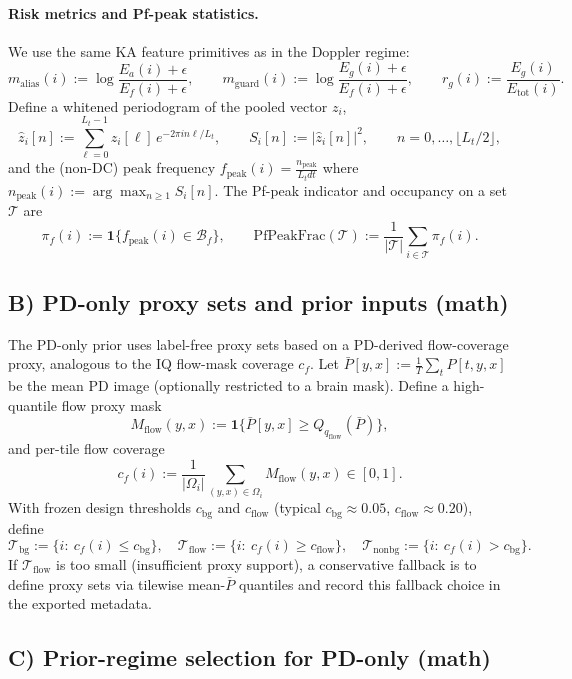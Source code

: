 \documentclass[11pt]{article}
\newcommand{\wh}{\widehat}
\newcommand{\Cf}{\mathcal{B}_f}
\begin{document}
\paragraph{Risk metrics and Pf-peak statistics.}
We use the same KA feature primitives as in the Doppler regime:
\[
m_{\mathrm{alias}}(i) := \log\frac{E_a(i)+\epsilon}{E_f(i)+\epsilon},\qquad
m_{\mathrm{guard}}(i) := \log\frac{E_g(i)+\epsilon}{E_f(i)+\epsilon},\qquad
r_g(i) := \frac{E_g(i)}{E_{\mathrm{tot}}(i)}.
\]
Define a whitened periodogram of the pooled vector $z_i$,
\[
\wh z_i[n] := \sum_{\ell=0}^{L_t-1} z_i[\ell]\,e^{-2\pi i n\ell/L_t},\qquad
S_i[n] := |\wh z_i[n]|^2,\qquad n=0,\dots,\lfloor L_t/2\rfloor,
\]
and the (non-DC) peak frequency $f_{\mathrm{peak}}(i)=\frac{n_{\mathrm{peak}}}{L_t dt}$ where
$n_{\mathrm{peak}}(i):=\arg\max_{n\ge 1} S_i[n]$. The Pf-peak indicator and occupancy on a set $\mathcal{T}$ are
\[
\pi_f(i) := \mathbf{1}\{f_{\mathrm{peak}}(i)\in\Cf\},\qquad
\mathrm{PfPeakFrac}(\mathcal{T}) := \frac{1}{|\mathcal{T}|}\sum_{i\in\mathcal{T}}\pi_f(i).
\]

\subsection*{B) PD-only proxy sets and prior inputs (math)}
The PD-only prior uses label-free proxy sets based on a PD-derived flow-coverage proxy, analogous to the IQ flow-mask coverage $c_f$.
Let $\bar P[y,x] := \frac{1}{T}\sum_t P[t,y,x]$ be the mean PD image (optionally restricted to a brain mask). Define a high-quantile flow proxy mask
\[
M_{\mathrm{flow}}(y,x) := \mathbf{1}\{\bar P[y,x]\ge Q_{q_{\mathrm{flow}}}(\bar P)\},
\]
and per-tile flow coverage
\[
c_f(i) := \frac{1}{|\Omega_i|}\sum_{(y,x)\in\Omega_i} M_{\mathrm{flow}}(y,x)\in[0,1].
\]
With frozen design thresholds $c_{\mathrm{bg}}$ and $c_{\mathrm{flow}}$ (typical $c_{\mathrm{bg}}\approx 0.05$, $c_{\mathrm{flow}}\approx 0.20$), define
\[
\mathcal{T}_{\mathrm{bg}} := \{i:\ c_f(i)\le c_{\mathrm{bg}}\},\quad
\mathcal{T}_{\mathrm{flow}} := \{i:\ c_f(i)\ge c_{\mathrm{flow}}\},\quad
\mathcal{T}_{\mathrm{nonbg}} := \{i:\ c_f(i)>c_{\mathrm{bg}}\}.
\]
If $\mathcal{T}_{\mathrm{flow}}$ is too small (insufficient proxy support), a conservative fallback is to define proxy sets via tilewise mean-$\bar P$ quantiles and record this fallback choice in the exported metadata.

\subsection*{C) Prior-regime selection for PD-only (math)}
\end{document}
